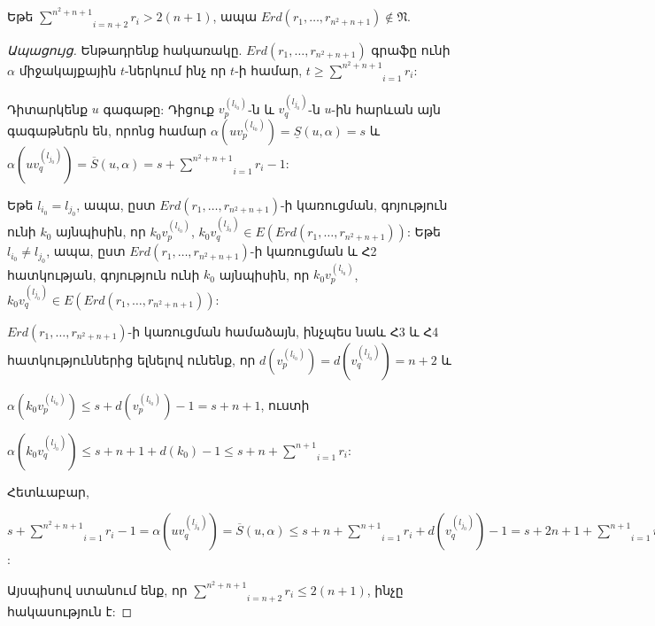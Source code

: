 \begin{hide}
\begin{theorem}
\label{t3_Erdos} Եթե $\underset{i=n+2}{\overset{n^{2}+n+1}{\sum
}}r_{i}> 2(n+1)$, ապա $Erd(r_{1},\ldots,r_{n^{2}+n+1})\notin
\mathfrak{N}$.
\end{theorem}
\begin{proof}[Ապացույց]
Ենթադրենք հակառակը.
$Erd(r_{1},\ldots,r_{n^{2}+n+1})$ գրաֆը ունի $\alpha$ միջակայքային $t$-ներկում
ինչ որ $t$-ի համար, $t\geq \underset{i=1}{\overset{n^{2}+n+1}{\sum
}}r_{i}$:

Դիտարկենք $u$ գագաթը: Դիցուք $v_{p}^{(l_{i_{0}})}$-ն և
$v_{q}^{(l_{j_{0}})}$-ն $u$-ին հարևան այն գագաթներն են, որոնց համար 
$\alpha\left(uv_{p}^{(l_{i_{0}})}\right)=\underline{S}(u,\alpha)=s$ և
$\alpha\left(uv_{q}^{(l_{j_{0}})}\right)=\overline{S}(u,\alpha)=s+\underset{i=1}{\overset{n^{2}+n+1}{\sum
}}r_{i}-1$:

Եթե $l_{i_{0}}=l_{j_{0}}$, ապա, ըստ 
$Erd(r_{1},\ldots,r_{n^{2}+n+1})$-ի կառուցման, գոյություն ունի $k_{0}$ այնպիսին, որ
$k_{0}v_{p}^{(l_{i_{0}})}$, $k_{0}v_{q}^{(l_{j_{0}})}\in
E(Erd(r_{1},\ldots,r_{n^{2}+n+1}))$: Եթե $l_{i_{0}}\neq l_{j_{0}}$,
ապա, ըստ $Erd(r_{1},\ldots,r_{n^{2}+n+1})$-ի կառուցման և
Հ2 հատկության, գոյություն ունի $k_{0}$ այնպիսին, որ
$k_{0}v_{p}^{(l_{i_{0}})}$, $k_{0}v_{q}^{(l_{j_{0}})}\in
E(Erd(r_{1},\ldots,r_{n^{2}+n+1}))$:

$Erd(r_{1},\ldots,r_{n^{2}+n+1})$-ի կառուցման համաձայն, ինչպես նաև Հ3 և Հ4 հատկություններից ելնելով ունենք, որ
$d\left(v_{p}^{(l_{i_{0}})}\right)=d\left(v_{q}^{(l_{j_{0}})}\right)=n+2$
և
\begin{center}
$\alpha\left(k_{0}v_{p}^{(l_{i_{0}})}\right)\leq
s+d\left(v_{p}^{(l_{i_{0}})}\right)-1=s+n+1$, ուստի
\end{center}
\begin{center}
$\alpha\left(k_{0}v_{q}^{(l_{j_{0}})}\right)\leq
s+n+1+d(k_{0})-1\leq s+n+\underset{i=1}{\overset{n+1}{\sum }}r_{i}$:
\end{center}

Հետևաբար,
\begin{center}
$s+\underset{i=1}{\overset{n^{2}+n+1}{\sum
}}r_{i}-1=\alpha\left(uv_{q}^{(l_{j_{0}})}\right)=\overline{S}(u,\alpha)\leq
s+n+\underset{i=1}{\overset{n+1}{\sum
}}r_{i}+d\left(v_{q}^{(l_{j_{0}})}\right)-1=s+2n+1+\underset{i=1}{\overset{n+1}{\sum
}}r_{i}$:
\end{center}

Այսպիսով ստանում ենք, որ $\underset{i=n+2}{\overset{n^{2}+n+1}{\sum }}r_{i}\leq
2(n+1)$, ինչը հակասություն է:
\end{proof}


\end{hide}
